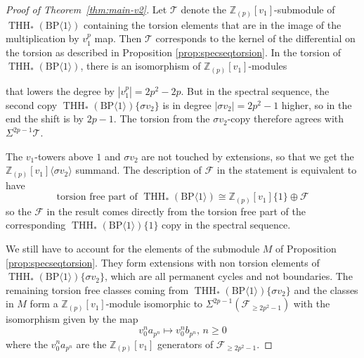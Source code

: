 \documentclass[11pt]{amsart}
\newcommand{\mr}[1]{\mathrm{#1}}
\newcommand{\Z}{\mathbb{Z}}
\newcommand{\BP}{\mr{BP}}
\DeclareMathOperator{\im}{im}
\DeclareMathOperator{\THH}{THH}
\theoremstyle{definition}
\numberwithin{equation}{section}
\numberwithin{figure}{section}
\begin{document}
\begin{proof}[Proof of Theorem~\ref{thm:main-v2}]
Let $\mathcal{T}$ denote the $\Z_{(p)}[v_1]$-submodule of $\THH_*(\BP \langle 1 \rangle)$ containing the torsion elements that are in the image of the multiplication by $v_1^p$ map. Then $\mathcal{T}$ corresponds to the kernel of the differential on the torsion as described in Proposition \ref{prop:specseqtorsion}. In the torsion of $\THH_*(\BP \langle 1 \rangle)$, there is an isomorphism of $\Z_{(p)}[v_1]$-modules
  \begin{center}
  \end{center}
  that lowers the degree by $|v_1^p| = 2p^2 - 2p$. But in the spectral sequence, the second copy $\THH_*(\BP \langle 1 \rangle)\{ \sigma v_2\}$ is in degree $|\sigma v_2| = 2p^2 - 1$ higher, so in the end the shift is by $2p -1$. The torsion from the $\sigma v_2$-copy therefore agrees with $\Sigma^{2p-1} \mathcal{T}$.

  The $v_1$-towers above $1$ and $\sigma v_2$ are not touched by extensions, so that we get the $\Z_{(p)}[v_1]\langle \sigma v_2 \rangle$ summand. The description of $\mathcal{F}$ in the statement is equivalent to have
  \[
    \text{torsion free part of } \THH_*(\BP \langle 1 \rangle) \cong \Z_{(p)}[v_1] \{1\} \oplus \mathcal{F}
  \]
  so the $\mathcal{F}$ in the result comes directly from the torsion free part of the corresponding $\THH_*(\BP \langle 1 \rangle)\{1\}$ copy in the spectral sequence.

  We still have to account for the elements of the submodule $M$ of Proposition \ref{prop:specseqtorsion}. They form extensions with non torsion elements of $\THH_*(\BP \langle 1 \rangle)\{ \sigma v_2\}$, which are all permanent cycles and not boundaries. The remaining torsion free classes coming from $\THH_*(\BP \langle 1 \rangle)\{ \sigma v_2\}$ and the classes in $M$ form a $\Z_{(p)}[v_1]$-module isomorphic to $\Sigma^{2p-1}(\mathcal{F}_{\geq 2p^2 - 1})$ with the isomorphism given by the map
  \[
    v_0^n a_{p^n} \mapsto v_0^n b_{p^n},\, n \geq 0
  \]
  where the $v_0^n a_{p^n}$ are the $\Z_{(p)}[v_1]$ generators of $\mathcal{F}_{\geq 2p^2 - 1}$.
\end{proof}
\end{document}

